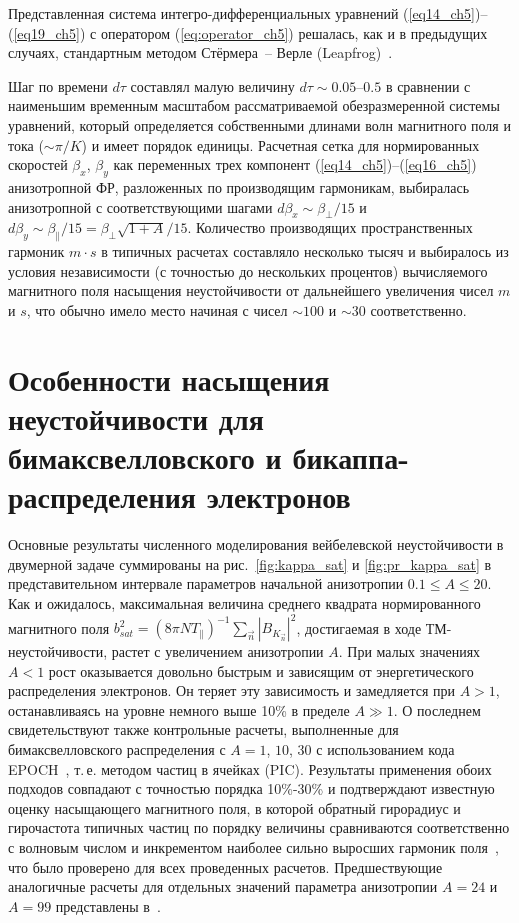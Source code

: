 Представленная система интегро-дифференциальных уравнений (\ref{eq14_ch5})--(\ref{eq19_ch5}) с оператором (\ref{eq:operator_ch5}) решалась, как и в предыдущих случаях, стандартным методом Стёрмера~-- Верле (Leapfrog)~\cite{Birdsall2018}. 

Шаг по времени $d\tau$ составлял малую величину $d\tau\sim 0.05$--$0.5$ в сравнении с наименьшим временным масштабом рассматриваемой обезразмеренной системы уравнений, который определяется собственными длинами волн магнитного поля и тока ($\sim \! {\pi}/{K}$) и имеет порядок единицы. 
Расчетная сетка для нормированных скоростей $\beta_x$, $\beta_y$ как переменных трех компонент (\ref{eq14_ch5})--(\ref{eq16_ch5})  анизотропной ФР, разложенных по производящим гармоникам, выбиралась анизотропной с соответствующими шагами $d\beta_x\sim{\beta_{\perp}}/{15}$ и $d\beta_y\sim{\beta_{\|}}/{15}={\beta_{\perp}\sqrt{1+A}}/{15}$. 
Количество производящих пространственных гармоник $m\cdot s$ в типичных расчетах составляло несколько тысяч и выбиралось из условия независимости (с точностью до нескольких процентов) вычисляемого магнитного поля насыщения неустойчивости от дальнейшего увеличения чисел $m$ и $s$, что обычно имело место начиная с чисел $\sim\! 100$ и $\sim\! 30$ соответственно. 

\section{Особенности насыщения неустойчивости для бимаксвелловского и бикаппа-распределения электронов}
\label{ch:ch5/sec2}
Основные результаты численного моделирования вейбелевской неустойчивости в двумерной задаче суммированы на рис.~\ref{fig:kappa_sat} и \ref{fig:pr_kappa_sat} в представительном интервале параметров начальной анизотропии $0.1\leq A \leq 20$. 
Как и ожидалось, максимальная величина среднего квадрата нормированного магнитного поля $b_{sat}^2 = {({8\pi N T_{\|}})^{-1}} \sum_{\vec{n}} {|B_{K_{\vec{n}}}|^{2}} $, достигаемая в ходе ТМ-неустойчивости, растет с увеличением анизотропии $A$. 
При малых значениях $A < 1$ рост оказывается довольно быстрым и зависящим от энергетического распределения электронов. 
Он теряет эту зависимость и замедляется при $A > 1$, останавливаясь на уровне немного выше 10\% в пределе $A \gg 1$. 
О последнем свидетельствуют также контрольные расчеты, выполненные для бимаксвелловского распределения с $A = 1$, $10$, $30$ с использованием кода EPOCH~\cite{Arber2015}, т.\,е. методом частиц в ячейках (PIC). 
Результаты применения обоих подходов совпадают с точностью порядка 10\%-30\% и подтверждают известную оценку насыщающего магнитного поля, в которой обратный гирорадиус и гирочастота типичных частиц по порядку величины сравниваются соответственно с волновым числом и инкрементом наиболее сильно выросших гармоник поля~\cite{Borodachev2016_Radiofiz, Nechaev2019_Radiophys, Garasev2022_JPP}, что было проверено для всех проведенных расчетов. 
Предшествующие аналогичные расчеты для отдельных значений параметра анизотропии $A = 24$ и $A = 99$ представлены в~\cite{Morse1971, Stockem2009}. 

